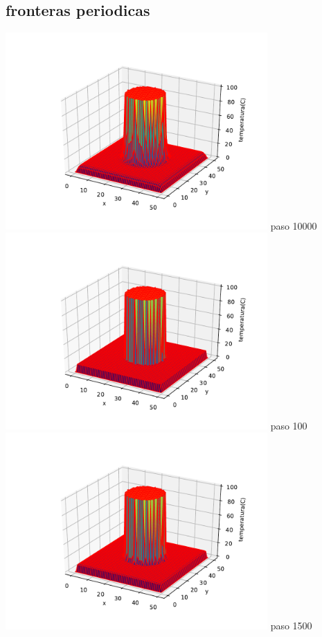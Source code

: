 \documentclass[12pt]{article}
\begin{document}
\begin{centering}
\subsection{fronteras periodicas}
\includegraphics[width=0.75\textwidth]{3d8.pdf}
paso 10000
\\
\includegraphics[width=0.75\textwidth]{3d9.pdf}
paso 100
\\
\includegraphics[width=0.75\textwidth]{3d10.pdf}
paso 1500


\end{centering}

 
\end{document}
